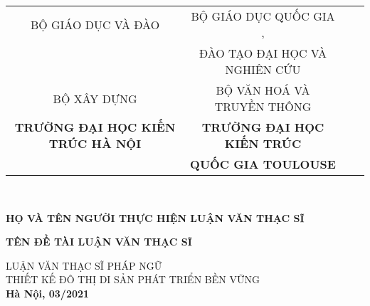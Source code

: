 \documentclass[../thesis.tex]{subfiles}
\begin{document}
\begin{titlepage}

\begin{center}
\begin{table}
\small
\centering
\begin{tabular}{c c r l}
BỘ GIÁO DỤC VÀ ĐÀO   &  BỘ GIÁO DỤC QUỐC GIA ,\\
 & ĐÀO TẠO ĐẠI HỌC VÀ NGHIÊN CỨU\\ 
BỘ XÂY DỰNG & BỘ VĂN HOÁ VÀ TRUYỀN THÔNG\\
\textbf{TRƯỜNG ĐẠI HỌC KIẾN TRÚC HÀ NỘI} & \textbf{TRƯỜNG ĐẠI HỌC KIẾN TRÚC}\\
& \textbf{QUỐC GIA TOULOUSE}
\end{tabular}
\\[2cm]
\end{table}

\textbf{HỌ VÀ TÊN NGƯỜI THỰC HIỆN LUẬN VĂN THẠC SĨ\\[2cm]}


\textbf{\large TÊN ĐỀ TÀI LUẬN VĂN THẠC SĨ \\[2cm]}

LUẬN VĂN THẠC SĨ PHÁP NGỮ\\
THIẾT KẾ ĐÔ THỊ DI SẢN PHÁT TRIỂN BỀN VỮNG\\[8cm]


\textbf{Hà Nội, 03/2021}

\end{center}

\end{titlepage}
\end{document}
